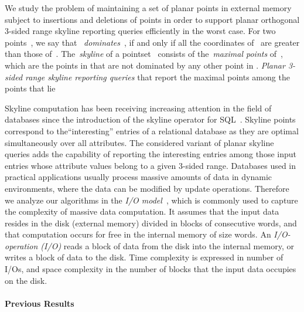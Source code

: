 \documentclass[]{article}
\begin{document}
We study the problem of maintaining a set of planar points in external memory
subject to insertions and deletions of points in order to support planar
orthogonal 3-sided range skyline reporting queries efficiently in the worst
case. For two points~, we say that~
\textit{dominates}~, if and only if all the coordinates of~ are greater
than those of~. The~\textit{skyline} of a pointset~ consists of
the~\textit{maximal points} of~, which are the points in  that are not
dominated by any other point in . \textit{Planar 3-sided range skyline
reporting queries} that report the maximal points among the points that lie

Skyline computation has been receiving increasing attention in the field of
databases since the introduction of the skyline operator for SQL~\cite{BKS01}.
Skyline points correspond to the``interesting'' entries of a relational database
as they are optimal simultaneously over all attributes. The considered variant
of planar skyline queries adds the capability of reporting the interesting
entries among those input entries whose attribute values belong to a given
3-sided range.  Databases used in practical applications usually process massive
amounts of data in dynamic environments, where the data can be modified by
update operations.  Therefore we analyze our algorithms in the \textit{I/O
model}~\cite{AV88}, which is commonly used to capture the complexity of massive
data computation.  It assumes that the input data resides in the disk (external
memory) divided in blocks of  consecutive words, and that computation occurs
for free in the internal memory of size  words.  An \textit{I/O-operation
(I/O)} reads a block of data from the disk into the internal memory, or writes a
block of data to the disk. Time complexity is expressed in number of I/Os, and
space complexity in the number of blocks that the input data occupies on the
disk.

\paragraph{Previous Results}
\end{document}

